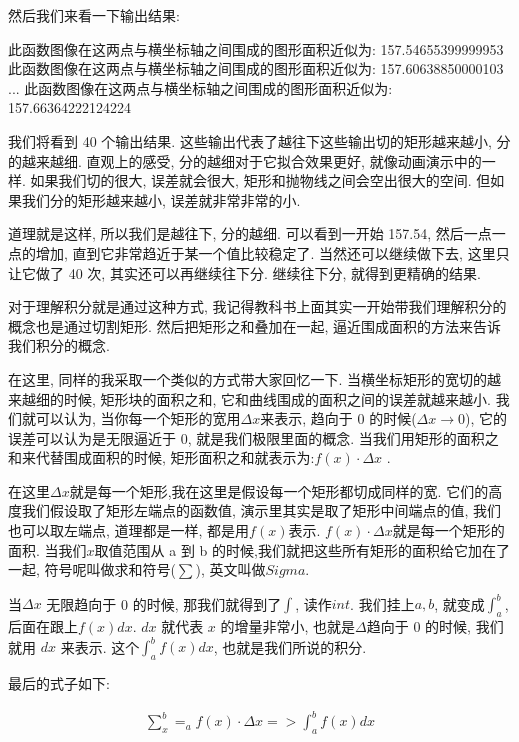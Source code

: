 然后我们来看一下输出结果:

\begin{python}
此函数图像在这两点与横坐标轴之间围成的图形面积近似为: 157.54655399999953
此函数图像在这两点与横坐标轴之间围成的图形面积近似为: 157.60638850000103
...
此函数图像在这两点与横坐标轴之间围成的图形面积近似为: 157.66364222124224
\end{python}

我们将看到 40 个输出结果. 这些输出代表了越往下这些输出切的矩形越来越小, 分的越来越细. 直观上的感受, 分的越细对于它拟合效果更好, 就像动画演示中的一样. 如果我们切的很大, 误差就会很大, 矩形和抛物线之间会空出很大的空间. 但如果我们分的矩形越来越小, 误差就非常非常的小. 

道理就是这样, 所以我们是越往下, 分的越细. 可以看到一开始 157.54, 然后一点一点的增加, 直到它非常趋近于某一个值比较稳定了. 当然还可以继续做下去, 这里只让它做了 40 次, 其实还可以再继续往下分. 继续往下分, 就得到更精确的结果. 

对于理解积分就是通过这种方式, 我记得教科书上面其实一开始带我们理解积分的概念也是通过切割矩形. 然后把矩形之和叠加在一起, 逼近围成面积的方法来告诉我们积分的概念. 

在这里, 同样的我采取一个类似的方式带大家回忆一下. 当横坐标矩形的宽切的越来越细的时候, 矩形块的面积之和, 它和曲线围成的面积之间的误差就越来越小. 我们就可以认为, 当你每一个矩形的宽用$\Delta x$来表示, 趋向于 0 的时候($\Delta x \to 0$), 它的误差可以认为是无限逼近于 0, 就是我们极限里面的概念. 当我们用矩形的面积之和来代替围成面积的时候, 矩形面积之和就表示为:$f(x) \cdot \Delta x$ . 

在这里$\Delta x$就是每一个矩形,我在这里是假设每一个矩形都切成同样的宽. 它们的高度我们假设取了矩形左端点的函数值, 演示里其实是取了矩形中间端点的值, 我们也可以取左端点, 道理都是一样, 都是用$f(x)$表示. $f(x)\cdot \Delta x$就是每一个矩形的面积. 当我们$x$取值范围从 a 到 b 的时候,我们就把这些所有矩形的面积给它加在了一起, 符号呢叫做求和符号($\sum$), 英文叫做$\mathord{Sigma}$. 

当$\Delta x$ 无限趋向于 0 的时候, 那我们就得到了$\int$, 读作$\mathord{int}$. 我们挂上$a,b$, 就变成$\int_a^b$, 后面在跟上$f(x)dx$. $dx$ 就代表 $x$ 的增量非常小, 也就是$\Delta$趋向于 0 的时候, 我们就用 $dx$ 来表示. 这个$\int_a^b f(x)dx$, 也就是我们所说的积分. 

最后的式子如下:

\begin{align*}
  \sum_x^b = _a f(x) \cdot \Delta x => \int_a^b f(x)dx
\end{align*}

